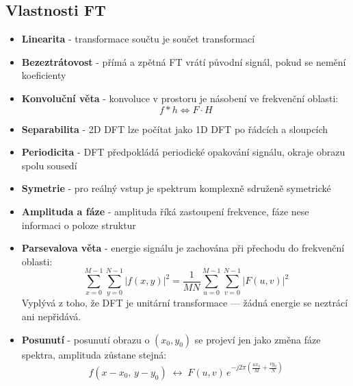 \subsection*{Vlastnosti FT}
\begin{itemize}
    \item \textbf{Linearita} - transformace součtu je součet transformací
    \item \textbf{Bezeztrátovost} - přímá a zpětná FT vrátí původní signál, pokud se nemění koeficienty
    \item \textbf{Konvoluční věta} - konvoluce v prostoru je násobení ve frekvenční oblasti:
          \begin{equation}
              f*h \Longleftrightarrow F\cdot H
          \end{equation}
    \item \textbf{Separabilita} - 2D DFT lze počítat jako 1D DFT po řádcích a sloupcích
    \item \textbf{Periodicita} - DFT předpokládá periodické opakování signálu, okraje obrazu spolu sousedí
    \item \textbf{Symetrie} - pro reálný vstup je spektrum komplexně sdruženě symetrické
    \item \textbf{Amplituda a fáze} - amplituda říká zastoupení frekvence, fáze nese informaci o poloze struktur
    \item \textbf{Parsevalova věta} - energie signálu je zachována při přechodu do frekvenční oblasti:
          \begin{equation}
              \sum_{x=0}^{M-1}\sum_{y=0}^{N-1}|f(x,y)|^2
              =\frac{1}{MN}\sum_{u=0}^{M-1}\sum_{v=0}^{N-1}|F(u,v)|^2
          \end{equation}
          Vyplývá z toho, že DFT je unitární transformace --- žádná energie se neztrácí ani nepřidává.
    \item \textbf{Posunutí} - posunutí obrazu o $(x_0,y_0)$ se projeví jen jako změna fáze spektra, amplituda zůstane stejná:
          \begin{equation}
              f(x-x_0,\,y-y_0)\;\longleftrightarrow\;
              F(u,v)\,e^{-j2\pi\!\left(\frac{ux_0}{M}+\frac{vy_0}{N}\right)}
          \end{equation}
\end{itemize}

